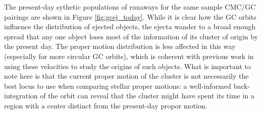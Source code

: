 \documentclass[twocolumn]{aastex631}
\newcommand{\CMC}{\texttt{CMC}}
\begin{document}
The present-day sythetic populations of runaways for the same sample CMC/GC pairings are shown in Figure \ref{fig:gcej_today}.
While it is clear how the GC orbits influence the distribution of ejected objects, the ejecta wander to a broad enough spread that any one object loses most of the information of its cluster of origin by the present day.
The proper motion distribution is less affected in this way (especially for more circular GC orbits), which is coherent with previous work in using these velocities to study the origins of such objects.
What is important to note here is that the current proper motion of the cluster is not necessarily the best locus to use when comparing stellar proper motions: a well-informed back-integration of the orbit can reveal that the cluster might have spent its time in a region with a center distinct from the present-day propor motion.

\begin{figure*}
    \caption{
        Present-day positions (galactic longitude/latitude) and velocities (projected onto the galactic longitude/latitude directions) for the runaway objects from the sample GCs.
        The color scale again denotes the time of ejection.
        The back-integrated orbits are shown as the light gray trajectories, and the blue "x" is the position/velocity of the GC as measured by \citet{2018MNRAS.478.1520B}.
    }
    \label{fig:gcej_today}
\end{figure*}


\end{document}
